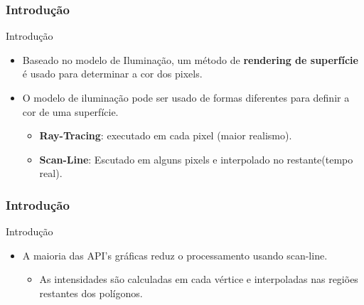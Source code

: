 \documentclass{beamer}
\begin{document}
\begin{frame}
\frametitle{Introdução}

		\begin{block}{Introdução}
		\begin{itemize}
			\item Baseado no modelo de Iluminação, um método de \textbf{rendering de superfície} é usado para determinar a cor dos pixels.
			\item O modelo de iluminação pode ser usado de formas diferentes para definir a cor de uma superfície.
			\begin{itemize}
				\item \textbf{Ray-Tracing}: executado em cada pixel (maior realismo).
				\item \textbf{Scan-Line}: Escutado em alguns pixels e interpolado no restante(tempo real).
			\end{itemize}					 
		\end{itemize}
	\end{block}
	
\end{frame}



\begin{frame}
\frametitle{Introdução}

		\begin{block}{Introdução}
		\begin{itemize}
			\item A maioria das API's gráficas reduz  o processamento usando scan-line.
			\begin{itemize}
				\item As intensidades são calculadas em cada vértice e interpoladas nas regiões restantes dos polígonos.
			\end{itemize}							 
		\end{itemize}
	\end{block}
	
\end{frame}

\end{document}
